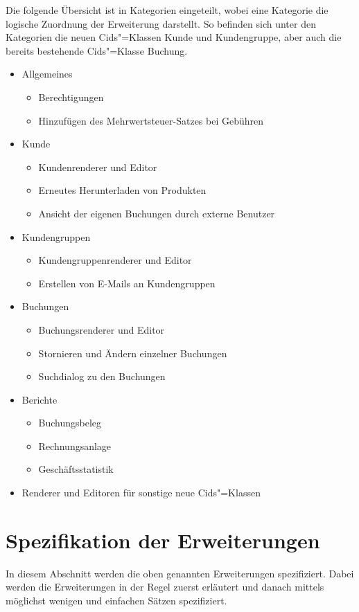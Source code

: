 Die folgende Übersicht ist in Kategorien eingeteilt, wobei eine Kategorie die logische Zuordnung der Erweiterung darstellt.
So befinden sich unter den Kategorien die neuen Cids"=Klassen Kunde und Kundengruppe, aber auch die bereits bestehende Cids"=Klasse Buchung. 
\begin{itemize}
	\item Allgemeines
	\begin{itemize}
		\item Berechtigungen
		\item Hinzufügen des Mehrwertsteuer-Satzes bei Gebühren
	\end{itemize}
	\item Kunde
	\begin{itemize}
		\item Kundenrenderer und Editor
		\item Erneutes Herunterladen von Produkten
		\item Ansicht der eigenen Buchungen durch externe Benutzer
	\end{itemize}
	\item Kundengruppen
	\begin{itemize}
		\item Kundengruppenrenderer und Editor
		\item Erstellen von E-Mails an Kundengruppen
	\end{itemize}
	\item Buchungen
	\begin{itemize}
		\item Buchungsrenderer und Editor
		\item Stornieren und Ändern einzelner Buchungen
		\item Suchdialog zu den Buchungen
	\end{itemize}
	\item Berichte
	\begin{itemize}
		\item Buchungsbeleg
		\item Rechnungsanlage
		\item Geschäftsstatistik
	\end{itemize}	 
	\item Renderer und Editoren für sonstige neue Cids"=Klassen
\end{itemize}

\section{Spezifikation der Erweiterungen} \label{sec:spezifikation}
In diesem Abschnitt werden die oben genannten Erweiterungen spezifiziert. Dabei werden die Erweiterungen in der Regel zuerst erläutert und danach mittels möglichst wenigen und einfachen Sätzen spezifiziert.

